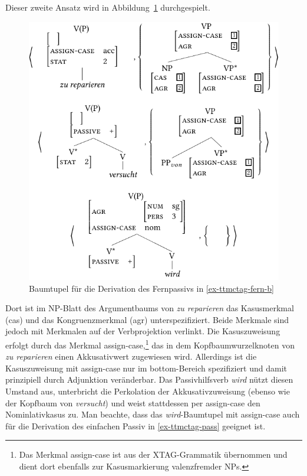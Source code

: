 Dieser zweite Ansatz wird in Abbildung~\ref{fig-ttmctag-fern-2} durchgespielt. 
\begin{figure}[t]
\centering
\includegraphics{graphics/abb723.pdf}
\caption{\label{fig-ttmctag-fern-2}Baumtupel für die Derivation des Fernpassivs in \ref{ex-ttmctag-fern-b}}
\end{figure}
Dort ist im NP-Blatt des Argumentbaums von {\it zu reparieren} das Kasusmerkmal ({\sc cas}) und das Kongruenzmerkmal ({\sc agr}) unterspezifiziert. Beide Merkmale sind jedoch mit Merkmalen auf der Verbprojektion verlinkt. Die Kasuszuweisung erfolgt durch das Merkmal {\sc assign-case},\footnote{Das Merkmal {\sc assign-case} ist aus der XTAG-Grammatik übernommen und dient dort ebenfalls zur Kasusmarkierung valenzfremder NPs.} das in dem Kopfbaumwurzelknoten von {\it zu reparieren} einen Akkusativwert zugewiesen wird. Allerdings ist die Kasuszuweisung mit {\sc assign-case} nur im {\sc bottom}-Bereich spezifiziert und damit prinzipiell durch Adjunktion veränderbar. Das Passivhilfsverb {\it wird} nützt diesen Umstand aus, unterbricht die Perkolation der Akkusativzuweisung (ebenso wie der Kopfbaum von {\it versucht}) und weist stattdessen per {\sc assign-case} den Nominlativkasus zu. Man beachte, dass das {\it wird}-Baumtupel mit {\sc assign-case} auch für die Derivation des einfachen Passiv in \ref{ex-ttmctag-pass} geeignet ist. %

